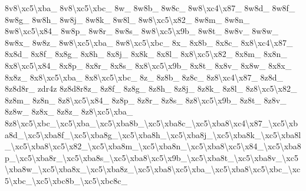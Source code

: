 \begin{DoxyCompactItemize}
8v8\textbackslash{}xc5\textbackslash{}xba\-\_\- 8v8\textbackslash{}xc5\textbackslash{}xbc\-\_\- 8w\-\_\- 8w8b\-\_\- 8w8c\-\_\- 8w8\textbackslash{}xc4\textbackslash{}x87\-\_\- 8w8d\-\_\- 8w8f\-\_\- 8w8g\-\_\- 8w8h\-\_\- 8w8j\-\_\- 8w8k\-\_\- 8w8l\-\_\- 8w8\textbackslash{}xc5\textbackslash{}x82\-\_\- 8w8m\-\_\- 8w8n\-\_\- 8w8\textbackslash{}xc5\textbackslash{}x84\-\_\- 8w8p\-\_\- 8w8r\-\_\- 8w8s\-\_\- 8w8\textbackslash{}xc5\textbackslash{}x9b\-\_\- 8w8t\-\_\- 8w8v\-\_\- 8w8w\-\_\- 8w8x\-\_\- 8w8z\-\_\- 8w8\textbackslash{}xc5\textbackslash{}xba\-\_\- 8w8\textbackslash{}xc5\textbackslash{}xbc\-\_\- 8x\-\_\- 8x8b\-\_\- 8x8c\-\_\- 8x8\textbackslash{}xc4\textbackslash{}x87\-\_\- 8x8d\-\_\- 8x8f\-\_\- 8x8g\-\_\- 8x8h\-\_\- 8x8j\-\_\- 8x8k\-\_\- 8x8l\-\_\- 8x8\textbackslash{}xc5\textbackslash{}x82\-\_\- 8x8m\-\_\- 8x8n\-\_\- 8x8\textbackslash{}xc5\textbackslash{}x84\-\_\- 8x8p\-\_\- 8x8r\-\_\- 8x8s\-\_\- 8x8\textbackslash{}xc5\textbackslash{}x9b\-\_\- 8x8t\-\_\- 8x8v\-\_\- 8x8w\-\_\- 8x8x\-\_\- 8x8z\-\_\- 8x8\textbackslash{}xc5\textbackslash{}xba\-\_\- 8x8\textbackslash{}xc5\textbackslash{}xbc\-\_\- 8z\-\_\- 8z8b\-\_\- 8z8c\-\_\- 8z8\textbackslash{}xc4\textbackslash{}x87\-\_\- 8z8d\-\_\- 8z8d8r\-\_\- zdr4z 8z8d8r8z\-\_\- 8z8f\-\_\- 8z8g\-\_\- 8z8h\-\_\- 8z8j\-\_\- 8z8k\-\_\- 8z8l\-\_\- 8z8\textbackslash{}xc5\textbackslash{}x82\-\_\- 8z8m\-\_\- 8z8n\-\_\- 8z8\textbackslash{}xc5\textbackslash{}x84\-\_\- 8z8p\-\_\- 8z8r\-\_\- 8z8s\-\_\- 8z8\textbackslash{}xc5\textbackslash{}x9b\-\_\- 8z8t\-\_\- 8z8v\-\_\- 8z8w\-\_\- 8z8x\-\_\- 8z8z\-\_\- 8z8\textbackslash{}xc5\textbackslash{}xba\-\_\- 8z8\textbackslash{}xc5\textbackslash{}xbc\-\_\textbackslash{}xc5\textbackslash{}xba\-\_\textbackslash{}xc5\textbackslash{}xba8b\-\_\textbackslash{}xc5\textbackslash{}xba8c\-\_\textbackslash{}xc5\textbackslash{}xba8\textbackslash{}xc4\textbackslash{}x87\-\_\textbackslash{}xc5\textbackslash{}xba8d\-\_\textbackslash{}xc5\textbackslash{}xba8f\-\_\textbackslash{}xc5\textbackslash{}xba8g\-\_\textbackslash{}xc5\textbackslash{}xba8h\-\_\textbackslash{}xc5\textbackslash{}xba8j\-\_\textbackslash{}xc5\textbackslash{}xba8k\-\_\textbackslash{}xc5\textbackslash{}xba8l\-\_\textbackslash{}xc5\textbackslash{}xba8\textbackslash{}xc5\textbackslash{}x82\-\_\textbackslash{}xc5\textbackslash{}xba8m\-\_\textbackslash{}xc5\textbackslash{}xba8n\-\_\textbackslash{}xc5\textbackslash{}xba8\textbackslash{}xc5\textbackslash{}x84\-\_\textbackslash{}xc5\textbackslash{}xba8p\-\_\textbackslash{}xc5\textbackslash{}xba8r\-\_\textbackslash{}xc5\textbackslash{}xba8s\-\_\textbackslash{}xc5\textbackslash{}xba8\textbackslash{}xc5\textbackslash{}x9b\-\_\textbackslash{}xc5\textbackslash{}xba8t\-\_\textbackslash{}xc5\textbackslash{}xba8v\-\_\textbackslash{}xc5\textbackslash{}xba8w\-\_\textbackslash{}xc5\textbackslash{}xba8x\-\_\textbackslash{}xc5\textbackslash{}xba8z\-\_\textbackslash{}xc5\textbackslash{}xba8\textbackslash{}xc5\textbackslash{}xba\-\_\textbackslash{}xc5\textbackslash{}xba8\textbackslash{}xc5\textbackslash{}xbc\-\_\textbackslash{}xc5\textbackslash{}xbc\-\_\textbackslash{}xc5\textbackslash{}xbc8b\-\_\textbackslash{}xc5\textbackslash{}xbc8c\-\_\- 
\end{DoxyCompactItemize}
